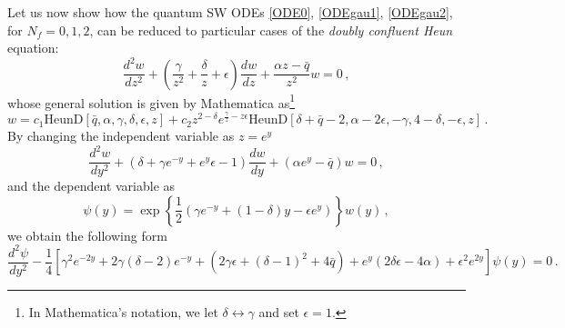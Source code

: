 \documentclass[11pt,a4paper]{elsarticle}
\newcommand{\be}{\begin{equation}}
\newcommand{\ee}{\end{equation}}
\numberwithin{figure}{section}
\numberwithin{table}{section}
\begin{document}
Let us now show how the quantum SW ODEs \eqref{ODE0}, \eqref{ODEgau1}, \eqref{ODEgau2}, for $N_f=0,1,2$, can be reduced to particular cases of the \emph{doubly confluent Heun} equation:
\be 
\frac{d^2 w}{d z^2}+\left(\frac{\gamma}{z^2}+ \frac{\delta}{z}+ \epsilon \right)\frac{d w}{d z}+\frac{\alpha z - \bar{q}}{z^2}w = 0\,,
\ee 
whose general solution is given by Mathematica as\footnote{In Mathematica's notation, we let $\delta \leftrightarrow \gamma$ and set $\epsilon=1$.}
\be 
w = c_1 \text{HeunD}[\bar{q},\alpha ,\gamma ,\delta ,\epsilon ,z]+c_2 z^{2-\delta } e^{\frac{\gamma }{z}-z \epsilon } \text{HeunD}[\delta +\bar{q}-2,\alpha -2 \epsilon ,-\gamma ,4-\delta ,-\epsilon ,z]\,.
\ee 
By changing the independent variable as $z = e^y$
\be 
\frac{d^2 w}{dy ^2}+(\delta +\gamma  e^{-y}+e^y \epsilon -1)\frac{d w}{dy}+(\alpha  e^y-\bar{q}) w = 0\,,
\ee
and the dependent variable as
\be 
\psi(y) = \exp \left\{ \frac{1}{2} \left(\gamma  e^{-y}+(1-\delta ) y-\epsilon e^y  \right) \right\} w(y)\,,
\ee 
we obtain the following form
\be  \label{dchexp}
\frac{d^2 \psi}{d y^2}-\frac{1}{4}  \left[\gamma ^2e^{-2 y}+2 \gamma  (\delta -2) e^{-y}+ \left(2 \gamma  \epsilon +(\delta -1)^2+4 \bar{q}\right)+e^{ y} (2 \delta  \epsilon -4 \alpha )+\epsilon ^2 e^{2 y} \right] \psi(y) = 0\,.
\ee 
\end{document}

